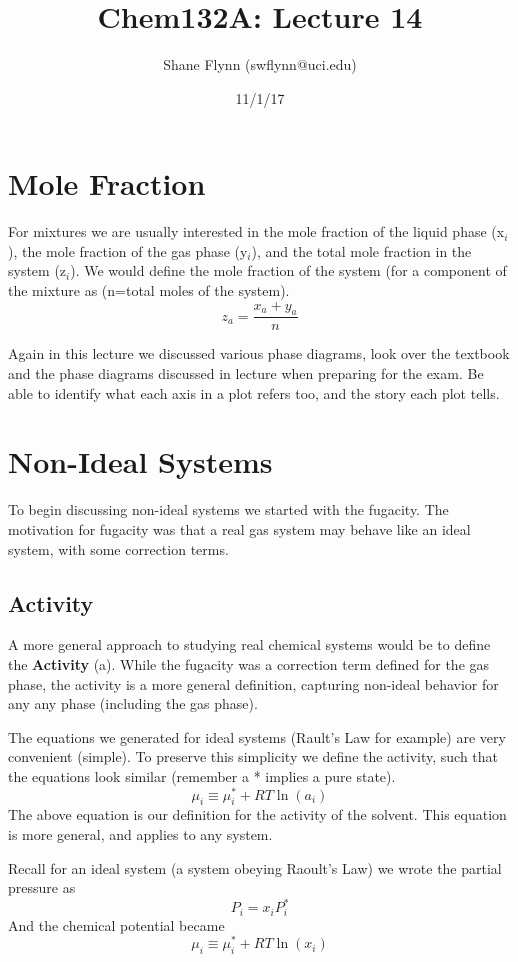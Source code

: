 \documentclass{article}
\title{Chem132A: Lecture 14}
\author{Shane Flynn (swflynn@uci.edu)}
\date{11/1/17}
\newcommand{\be}{\begin{equation}}
\newcommand{\ee}{\end{equation}}
\begin{document}
\maketitle

\section*{Mole Fraction}
For mixtures we are usually interested in the mole fraction of the liquid phase (x$_i$), the mole  fraction of the gas phase (y$_i$), and the total mole fraction in the system  (z$_i$).
We would define the mole fraction of the system (for a component of the mixture as (n=total moles of the system).
\be
z_a = \frac{x_a + y_a}{n}
\ee

Again in this lecture we discussed various phase diagrams, look  over the  textbook  and the phase diagrams  discussed in lecture when preparing for the exam.
Be  able to identify what each axis in a plot refers too, and  the story each plot tells. 

\section*{Non-Ideal Systems}
To begin discussing non-ideal systems we started with the fugacity.
The motivation for fugacity was that a real gas system may behave like an ideal system, with some correction terms. 

\subsection*{Activity}
A more general approach to studying real chemical systems would be to  define the \textbf{Activity} (a). 
While the fugacity was a correction term defined for the gas phase, the activity is a more general definition, capturing non-ideal behavior for any any phase (including the gas phase). 

The equations we generated for ideal systems (Rault's Law for example) are very convenient (simple).
To preserve this simplicity we define the activity, such that the equations look similar (remember a * implies a pure state).  
\be
\mu_i \equiv \mu_i^* + RT \ln(a_i)
\ee
The above equation is our definition for the activity of the solvent. 
This equation is more general, and applies to any system.

Recall for an ideal system (a system obeying Raoult's Law) we wrote the partial pressure as 
\be
P_i = x_i P_i^*
\ee
And the chemical potential became 
\be
\mu_i \equiv \mu_i^* + RT \ln(x_i)
\ee
\end{document}

